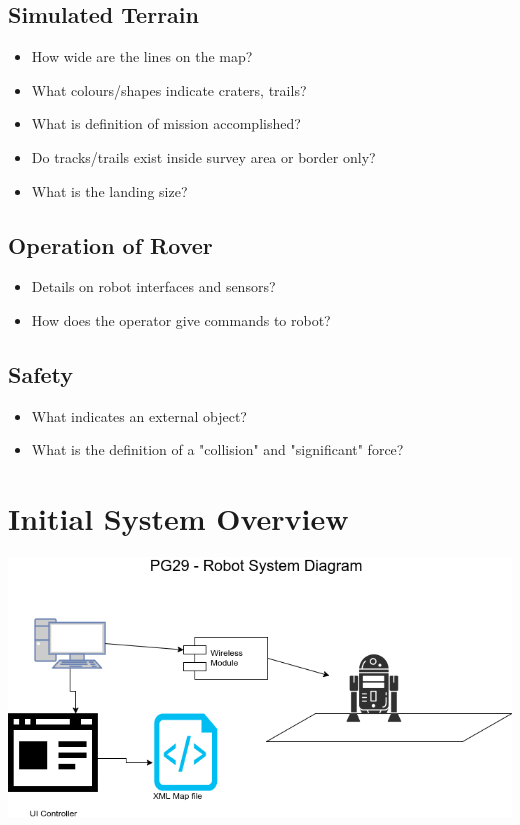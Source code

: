 \documentclass[11pt, a4paper]{article}
\begin{document}
\subsection{Simulated Terrain}
\begin{itemize}
	\item How wide are the lines on the map?
	\item What colours/shapes indicate craters, trails?
	\item What is definition of mission accomplished?
	\item Do tracks/trails exist inside survey area or border only?
	\item What is the landing size?
\end{itemize}

\subsection{Operation of Rover}
\begin{itemize}
	\item Details on robot interfaces and sensors?
	\item How does the operator give commands to robot?
\end{itemize}

\subsection{Safety}
\begin{itemize}
	\item What indicates an external object?
	\item What is the definition of a "collision" and "significant" force?
\end{itemize}

\section{Initial System Overview}
\includegraphics[width=\textwidth]{system-flowchart}
\end{document}

